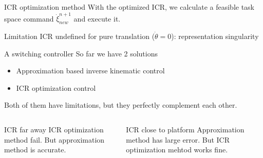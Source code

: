 \documentclass[10pt]{beamer}
\begin{document}
\begin{frame}{ICR optimization method}
    With the optimized ICR, we calculate a feasible task space command $\dot{\xi}^{n+1}_{new}$ and execute it.
    \begin{block}{Limitation}
      ICR undefined for pure translation ($\dot{\theta}=0$): representation singularity
    \end{block}
\end{frame}
\begin{frame}{A switching controller}
    So far we have 2 solutions
    \begin{itemize}
        \item Approximation based inverse kinematic control
        \item ICR optimization control
    \end{itemize}
    Both of them have limitations, but they perfectly complement each other.
    \begin{columns}
      \begin{block}{ICR far away}
      ICR optimization method fail. But approximation method is accurate.  
      \end{block}
      
      \begin{block}{ICR close to platform}
        Approximation method has large error. But ICR optimization mehtod works fine.
      \end{block}
    \end{columns}
    
\end{frame}
\end{document}
